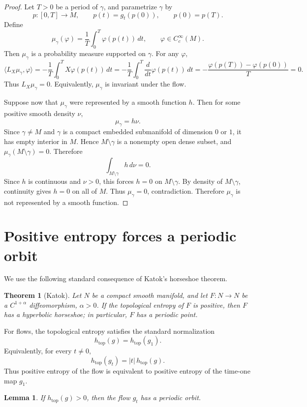 \documentclass[11pt]{article}
\newtheorem{theorem}{Theorem}
\newtheorem{lemma}{Lemma}
\begin{document}
\begin{proof}
Let \(T>0\) be a period of \(\gamma\), and parametrize \(\gamma\) by
\[
p:[0,T]\to M,\qquad p(t)=g_t(p(0)),\qquad p(0)=p(T).
\]
Define
\[
\mu_\gamma(\varphi)=\frac1T\int_0^T \varphi(p(t))\,dt,
\qquad \varphi\in C_c^\infty(M).
\]
Then \(\mu_\gamma\) is a probability measure supported on \(\gamma\). For any \(\varphi\),
\[
\langle L_X\mu_\gamma,\varphi\rangle
=
-\frac1T\int_0^T X\varphi(p(t))\,dt
=
-\frac1T\int_0^T \frac{d}{dt}\varphi(p(t))\,dt
=
-\frac{\varphi(p(T))-\varphi(p(0))}{T}
=0.
\]
Thus \(L_X\mu_\gamma=0\). Equivalently, \(\mu_\gamma\) is invariant under the flow.

Suppose now that \(\mu_\gamma\) were represented by a smooth function \(h\). Then for some positive smooth density \(\nu\),
\[
\mu_\gamma=h\nu.
\]
Since \(\gamma\neq M\) and \(\gamma\) is a compact embedded submanifold of dimension \(0\) or \(1\), it has empty interior in \(M\). Hence \(M\setminus\gamma\) is a nonempty open dense subset, and \(\mu_\gamma(M\setminus\gamma)=0\). Therefore
\[
\int_{M\setminus\gamma} h\,d\nu=0.
\]
Since \(h\) is continuous and \(\nu>0\), this forces \(h=0\) on \(M\setminus\gamma\). By density of \(M\setminus\gamma\), continuity gives \(h=0\) on all of \(M\). Thus \(\mu_\gamma=0\), contradiction. Therefore \(\mu_\gamma\) is not represented by a smooth function.
\end{proof}

\section{Positive entropy forces a periodic orbit}

We use the following standard consequence of Katok's horseshoe theorem.

\begin{theorem}[Katok]
Let \(N\) be a compact smooth manifold, and let \(F:N\to N\) be a \(C^{1+\alpha}\) diffeomorphism, \(\alpha>0\). If the topological entropy of \(F\) is positive, then \(F\) has a hyperbolic horseshoe; in particular, \(F\) has a periodic point.
\end{theorem}

For flows, the topological entropy satisfies the standard normalization
\[
h_{\mathrm{top}}(g)=h_{\mathrm{top}}(g_1).
\]
Equivalently, for every \(t\neq 0\),
\[
h_{\mathrm{top}}(g_t)=|t|\,h_{\mathrm{top}}(g).
\]
Thus positive entropy of the flow is equivalent to positive entropy of the time-one map \(g_1\).

\begin{lemma}
If \(h_{\mathrm{top}}(g)>0\), then the flow \(g_t\) has a periodic orbit.
\end{lemma}
\end{document}
